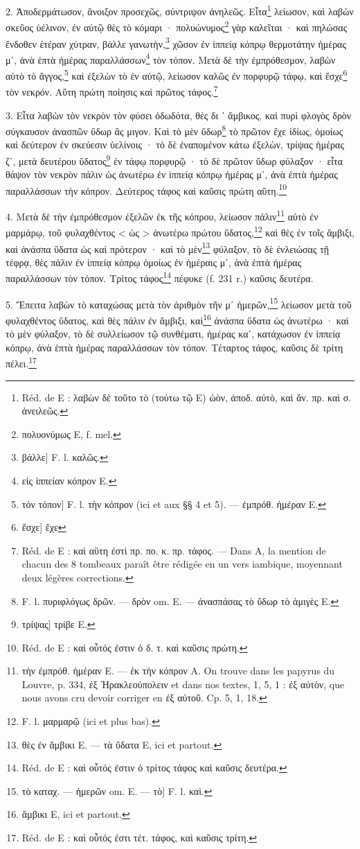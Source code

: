 \documentclass[a4paper, 11pt, oneside, polutonikogreek, french]{article}
\begin{document}
2. Ἀποδερμάτωσον, ἄνοιξον προσεχῶς, σύντριψον ἀνηλεῶς. Εἶτα\footnote{Réd. de E : λαβὼν δὲ τοῦτο τὸ (τούτω τῷ E) ὠὸν, ἀποδ. αὐτὸ, καὶ ἄν. πρ. καὶ σ. ἀνειλεῶς.} λείωσον, καὶ λαβὼν σκεῦος ὑέλινον, ἐν αὐτῷ θὲς τὸ κόμαρι · πολυώνυμος\footnote{πολυονύμως E, f. mel.} γὰρ καλεῖται · καὶ πηλώσας ἔνδοθεν ἑτέραν χύτραν, βάλλε γανωτὴν,\footnote{βάλλε] F. l. καλῶς.} χῶσον ἐν ἱππείᾳ κόπρῳ θερμοτάτην ἡμέρας μʹ, ἀνὰ ἑπτὰ ἡμέρας παραλλάσσων\footnote{εἰς ἱππείαν κόπρον E.} τὸν τόπον. Μετὰ δὲ τὴν ἐμπρόθεσμον, λαβὼν αὐτὸ τὸ ἄγγος,\footnote{τόν τόπον] F. l. τὴν κόπρον (ici et aux §§ 4 et 5). --- ἐμπρόθ. ἡμέραν E.} καὶ ἐξελὼν τὸ ἐν αὐτῷ, λείωσον καλῶς ἐν πορφυρῷ τάφῳ, καὶ ἔσχε\footnote{ἔσχε] ἔχε} τὸν νεκρόν. Αὕτη πρώτη ποίησις καὶ πρῶτος τάφος.\footnote{Réd. de E : καὶ αὕτη ἐστὶ πρ. πο. κ. πρ. τάφος. --- Dans A, la mention de chacun des 8 tombeaux paraît être rédigée en un vers iambique, moyennant deux légères corrections.}

3. Εἶτα λαβὼν τὸν νεκρὸν τὸν φύσει ὀδωδότα, θὲς δι ᾽ ἄμβικος, καὶ πυρὶ φλογὸς δρὸν σύγκαυσον ἀνασπῶν ὕδωρ ἂς μιγον. Καὶ τὸ μὲν ὕδωρ\footnote{F. l. πυριφλόγως δρῶν. --- δρὸν om. E. --- ἀνασπάσας τὸ ὕδωρ τὸ ἀμιγὲς E.} τὸ πρῶτον ἔχε ἰδίως, ὁμοίως καὶ δεύτερον ἐν σκεύεσιν ὑελίνοις · τὸ δὲ ἐναπομένον κάτω ἐξελὼν, τρίψας ἡμέρας ζʹ, μετὰ δευτέρου ὕδατος\footnote{τρίψας] τρίβε E.} ἐν τάφῳ πορφυρῷ · τὸ δὲ πρῶτον ὕδωρ φύλαξον · εἶτα θάψον τὸν νεκρὸν πάλιν ὡς ἀνωτέρω ἐν ἱππείᾳ κόπρῳ ἡμέρας μʹ, ἀνὰ ἑπτὰ ἡμέρας παραλλάσσων τὴν κόπρον. Δεύτερος τάφος καὶ καῦσις πρώτη αὕτη.\footnote{Réd. de E : καὶ οὗτός ἐστιν ὁ δ. τ. καὶ καῦσις πρώτη.}

4. Μετὰ δὲ τὴν ἐμπρόθεσμον ἐξελῶν ἐκ τῆς κόπρου, λείωσον πάλιν\footnote{τὴν ἐμπρόθ. ἡμέραν E. --- ἐκ τὴν κόπρον A. On trouve dans les papyrus du Louvre, p. 334, ἐξ Ἡρακλεούπολειν et dans nos textes, 1, 5, 1 : ἐξ αὐτὸν, que nous avons cru devoir corriger en ἐξ αὐτοῦ. Cp. 5, 1, 18.} αὐτὸ ἐν μαρμάρῳ, τοῦ φυλαχθέντος < ὡς > ἀνωτέρω πρώτου ὕδατος,\footnote{F. l. μαρμαρῷ (ici et plus bas).} καὶ θὲς ἐν τοῖς ἄμβιξι, καὶ ἀνάσπα ὕδατα ὡς καὶ πρότερον · καὶ τὸ μὲν\footnote{θὲς ἐν ἄμβικι E. --- τὰ ὕδατα E, ici et partout.} φύλαξον, τὸ δὲ ἐνλειώσας τῇ τέφρᾳ, θὲς πάλιν ἐν ἱππείᾳ κόπρῳ ὀμοίως ἐν ἡμέραις μʹ, ἀνὰ ἑπτὰ ἡμέρας παραλλάσσων τὸν τόπον. Τρίτος τάφος\footnote{Réd. de E : καὶ οὗτός ἐστιν ὁ τρίτος τάφος καὶ καῦσις δευτέρα.} πέφυκε (f. 231 r.) καῦσις δευτέρα.

5. Ἔπειτα λαβὼν τὸ καταχώσας μετὰ τὸν ἀριθμὸν τῆν μʹ ἡμερῶν,\footnote{τὸ καταχ. --- ἡμερῶν om. E. --- τὸ] F. l. καὶ.} λείωσον μετὰ τοῦ φυλαχθέντος ὕδατος, καὶ θὲς πάλιν ἐν ἄμβιξι, καὶ\footnote{ἄμβικι E, ici et partout.} ἀνάσπα ὕδατα ὡς ἀνωτέρω · καὶ τὸ μὲν φύλαξον, τὸ δὲ συλλείωσον τῷ συνθέματι, ἡμέρας καʹ, κατάχωσον ἐν ἱππείᾳ κόπρῳ, ἀνὰ ἑπτὰ ἡμέρας παραλλάσσων τὸν τόπον. Τέταρτος τάφος, καῦσις δὲ τρίτη πέλει.\footnote{Réd. de E : καὶ οὗτός ἐστι τέτ. τάφος, καὶ καῦσις τρίτη.}
\end{document}
